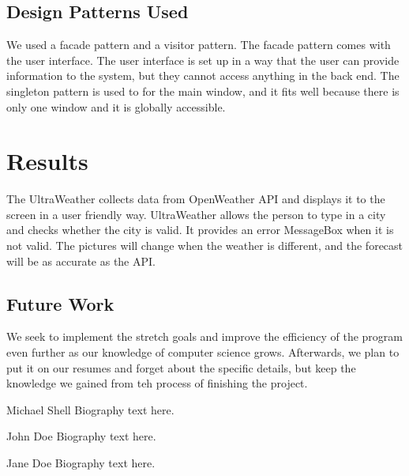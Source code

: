 \documentclass[10pt,conference,onecolumn,compsoc]{IEEEtran}
\begin{document}
\subsection{Design Patterns Used}
We used a facade pattern and a visitor pattern. The facade pattern comes with the user interface. The user interface is set up in a way that the user can provide information to the system, but they cannot access anything in the back end. The singleton pattern is used to for the main window, and it fits well because there is only one window and it is globally accessible. 


\section{Results}
The UltraWeather collects data from OpenWeather API and displays it to the screen in a user friendly way. UltraWeather allows the person to type in a city and checks whether the city is valid. It provides an error MessageBox when it is not valid. The pictures will change when the weather is different, and the forecast will be as accurate as the API.

\subsection{Future Work}
We seek to implement the stretch goals and improve the efficiency of the program even further as our knowledge of computer science grows. Afterwards, we plan to put it on our resumes and forget about the specific details, but keep the knowledge we gained from teh process of finishing the project.





\begin{IEEEbiography}{Michael Shell}
Biography text here.
\end{IEEEbiography}

\begin{IEEEbiographynophoto}{John Doe}
Biography text here.
\end{IEEEbiographynophoto}


\begin{IEEEbiographynophoto}{Jane Doe}
Biography text here.
\end{IEEEbiographynophoto}





\end{document}
